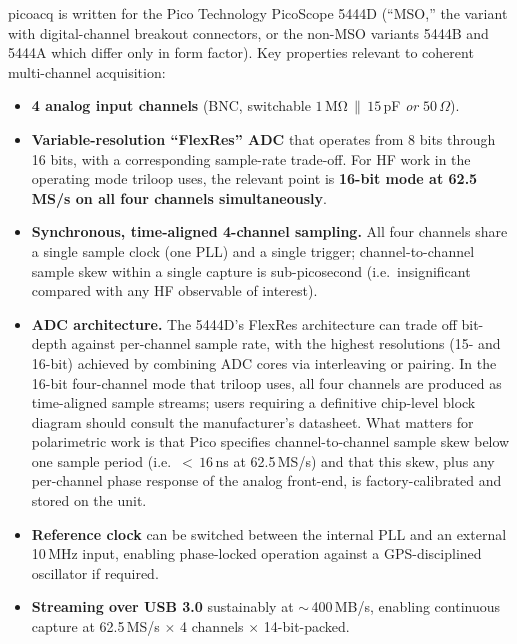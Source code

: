 \documentclass[11pt]{article}
\begin{document}
\textsf{picoacq} is written for the Pico Technology PicoScope 5444D
(``MSO,'' the variant with digital-channel breakout connectors, or the
non-MSO variants 5444B and 5444A which differ only in form factor).
Key properties relevant to coherent multi-channel acquisition:

\begin{itemize}\itemsep=2pt
\item \textbf{4 analog input channels} (BNC, switchable
      $1\,\mathrm{M\Omega}\,\|\,15$\,pF \emph{or} $50\,\Omega$).
\item \textbf{Variable-resolution ``FlexRes'' ADC} that operates from
      8 bits through 16 bits, with a corresponding sample-rate trade-off.
      For HF work in the operating mode \textsf{triloop} uses, the
      relevant point is \textbf{16-bit mode at 62.5\,MS/s on all four
      channels simultaneously}.
\item \textbf{Synchronous, time-aligned 4-channel sampling.}  All four
      channels share a single sample clock (one PLL) and a single
      trigger; channel-to-channel sample skew within a single capture
      is sub-picosecond (i.e.\ insignificant compared with any HF
      observable of interest).
\item \textbf{ADC architecture.}  The 5444D's FlexRes architecture
      can trade off bit-depth against per-channel sample rate, with
      the highest resolutions (15- and 16-bit) achieved by combining
      ADC cores via interleaving or pairing.  In the 16-bit
      four-channel mode that \textsf{triloop} uses, all four channels
      are produced as time-aligned sample streams; users requiring a
      definitive chip-level block diagram should consult the
      manufacturer's datasheet.  What matters for polarimetric work is
      that Pico specifies channel-to-channel sample skew below one
      sample period (i.e.\ $<\,16$\,ns at 62.5\,MS/s) and that this
      skew, plus any per-channel phase response of the analog
      front-end, is factory-calibrated and stored on the unit.
\item \textbf{Reference clock} can be switched between the internal
      PLL and an external 10\,MHz input, enabling phase-locked
      operation against a GPS-disciplined oscillator if required.
\item \textbf{Streaming over USB 3.0} sustainably at $\sim$\,400\,MB/s,
      enabling continuous capture at 62.5\,MS/s $\times$ 4 channels
      $\times$ 14-bit-packed.
\end{itemize}
\end{document}
